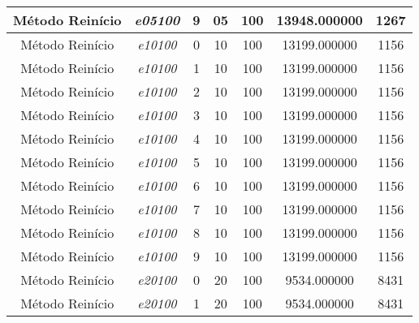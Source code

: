 {\begin{longtable}{cc|c|cc|cc}
			Método Reinício    & \textit{e05100}    & 9                               & 05               & 100              & 13948.000000                          & 1267 \\ \hline
			Método Reinício    & \textit{e10100}    & 0                               & 10               & 100              & 13199.000000                          & 1156 \\ 
			Método Reinício    & \textit{e10100}    & 1                               & 10               & 100              & 13199.000000                          & 1156 \\ 
			Método Reinício    & \textit{e10100}    & 2                               & 10               & 100              & 13199.000000                          & 1156 \\ 
			Método Reinício    & \textit{e10100}    & 3                               & 10               & 100              & 13199.000000                          & 1156 \\ 
			Método Reinício    & \textit{e10100}    & 4                               & 10               & 100              & 13199.000000                          & 1156 \\ 
			Método Reinício    & \textit{e10100}    & 5                               & 10               & 100              & 13199.000000                          & 1156 \\ 
			Método Reinício    & \textit{e10100}    & 6                               & 10               & 100              & 13199.000000                          & 1156 \\ 
			Método Reinício    & \textit{e10100}    & 7                               & 10               & 100              & 13199.000000                          & 1156 \\ 
			Método Reinício    & \textit{e10100}    & 8                               & 10               & 100              & 13199.000000                          & 1156 \\ 
			Método Reinício    & \textit{e10100}    & 9                               & 10               & 100              & 13199.000000                          & 1156 \\ \hline
			Método Reinício    & \textit{e20100}    & 0                               & 20               & 100              & 9534.000000                          & 8431 \\ 
			Método Reinício    & \textit{e20100}    & 1                               & 20               & 100              & 9534.000000                          & 8431 \\ 

\end{longtable}}
